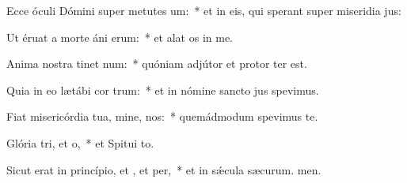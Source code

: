 \item Ecce óculi Dómini super metutes um:~* et in eis, qui sperant super miseridia jus:
\item Ut éruat a morte áni erum:~* et alat os in me.
\item Anima nostra tinet num:~* quóniam adjútor et protor ter est.
\item Quia in eo lætábi cor trum:~* et in nómine sancto jus spevimus.
\item Fiat misericórdia tua, mine,  nos:~* quemádmodum spevimus  te.
\item Glória tri, et o,~* et Spitui to.
\item Sicut erat in princípio, et , et per,~* et in sǽcula sæcurum. men.
